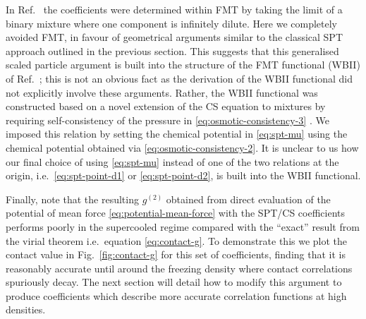 \documentclass[11pt,twoside]{report}
\begin{document}
In Ref.\ \cite{Hansen-GoosJPCM2006} the coefficients were determined within FMT by taking the limit of a binary mixture where one component is infinitely dilute.
Here we completely avoided FMT, in favour of geometrical arguments similar to the classical SPT approach outlined in the previous section.
This suggests that this generalised scaled particle argument is built into the structure of the FMT functional (WBII) of Ref.\ \cite{Hansen-GoosJPCM2006}; this is not an obvious fact as the derivation of the WBII functional did not explicitly involve these arguments.
Rather, the WBII functional was constructed based on a novel extension of the CS equation to mixtures by requiring self-consistency of the pressure in \eqref{eq:osmotic-consistency-3} \cite{Hansen-GoosJCP2006}.
We imposed this relation by setting the chemical potential in \eqref{eq:spt-mu} using the chemical potential obtained via \eqref{eq:osmotic-consistency-2}.
It is unclear to us how our final choice of using \eqref{eq:spt-mu} instead of one of the two relations at the origin, i.e.\ \eqref{eq:spt-point-d1} or \eqref{eq:spt-point-d2}, is built into the WBII functional.

Finally, note that the resulting $g^{(2)}$ obtained from direct evaluation of the potential of mean force \eqref{eq:potential-mean-force} with the SPT/CS coefficients performs poorly in the supercooled regime compared with the ``exact'' result from the virial theorem i.e.\ equation \eqref{eq:contact-g}.
To demonstrate this we plot the contact value in Fig.\ \ref{fig:contact-g} for this set of coefficients, finding that it is reasonably accurate until around the freezing density where contact correlations spuriously decay.
The next section will detail how to modify this argument to produce coefficients which describe more accurate correlation functions at high densities.
\end{document}
